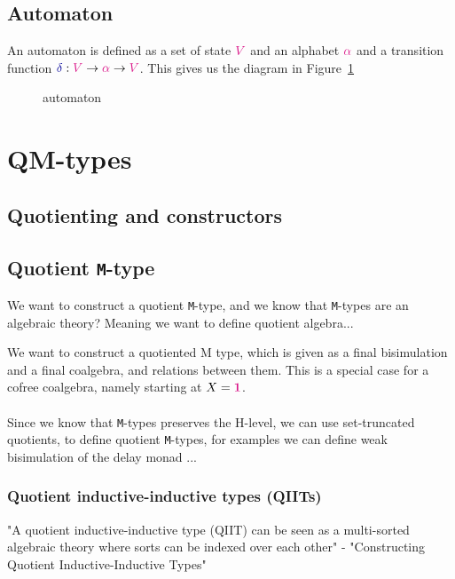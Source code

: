 \documentclass[twoside,11pt,openright]{report}
\theoremstyle{plain} %
\theoremstyle{definition}
\theoremstyle{remark}
\newcommand*{\figref}[1]{Figure~\ref{fig:#1}}
\newcommand*{\type}[1]{\textcolor{magenta!90!black}{#1}}
\newcommand*{\unit}{\type{\textbf{1}}}
\newcommand*{\function}[1]{\textcolor{blue!60!black}{\ensuremath{\mathtt{#1}}}}
\begin{document}
\section{Automaton}
An automaton is defined as a set of state \(\type{V}\) and an alphabet \(\type{\alpha}\) and a transition function \(\function{\delta} : \type{V} \rightarrow \type{\alpha} \rightarrow \type{V}\). This gives us the diagram in \figref{automaton}
\begin{figure}[h]
  \centering
  \caption{automaton}
  \label{fig:automaton}
\end{figure}


\chapter{QM-types}
\section{Quotienting and constructors}
\section{Quotient \texttt{M}-type}
We want to construct a quotient \texttt{M}-type, and we know that \texttt{M}-types are an algebraic theory? Meaning we want to define quotient algebra...

We want to construct a quotiented M type, which is given as a final bisimulation and a final coalgebra, and relations between them. This is a special case for a cofree coalgebra, namely starting at \(X = \unit\).
\\ \\
Since we know that \texttt{M}-types preserves the H-level, we can use set-truncated quotients, to define quotient \texttt{M}-types, for examples we can define weak bisimulation of the delay monad ...

\subsection{Quotient inductive-inductive types (QIITs)}
"A quotient inductive-inductive type (QIIT) can be seen as a multi-sorted algebraic theory where sorts can be indexed over each other" - "Constructing Quotient Inductive-Inductive Types"
\end{document}
